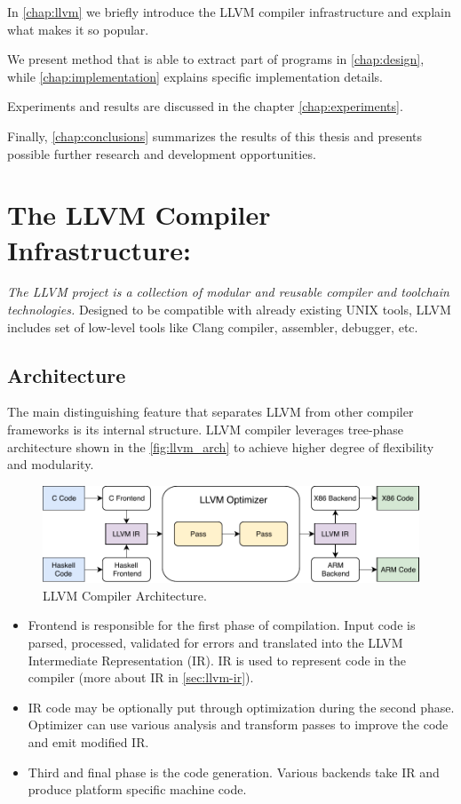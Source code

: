 \documentclass[12pt, twoside]{fithesis2}
\renewcommand{\_}{\leavevmode \kern0.07em\vbox{\hrule width0.4em}}
\newcommand{\squarebullet}{\textcolor{black}{\raisebox{0.15em}{\rule{4pt}{4pt}}}}
\newenvironment{myItemize}{
  \begin{itemize}[
    leftmargin=2em,
    rightmargin=1em,
    itemsep=\parskip,
    parsep=0em,
    topsep=0em,
    partopsep=0em
]
  \renewcommand{\labelitemi}{\squarebullet}
  \renewcommand{\labelitemii}{\textbullet}
}{
  \end{itemize}
}
\begin{document}
In \autoref{chap:llvm} we briefly introduce the LLVM compiler
infrastructure and explain what makes it so popular.

We present method that is able to extract part of programs in
\autoref{chap:design}, while \autoref{chap:implementation} explains specific
implementation details.

Experiments and results are discussed in the chapter
\autoref{chap:experiments}.

Finally, \autoref{chap:conclusions} summarizes the results of this thesis and
presents possible further research and development opportunities.


\chapter{The LLVM Compiler Infrastructure:}
\label{chap:llvm}

\emph{The LLVM project is a collection of modular and reusable compiler and
toolchain technologies.} \cite{llvm}
Designed to be compatible with already existing UNIX tools, LLVM includes
set of low-level tools like Clang compiler, assembler, debugger, etc. \cite{asoa}


\section{Architecture}
\label{sec:llvm-arch}

The main distinguishing feature that separates LLVM from other compiler
frameworks is its internal structure. LLVM compiler leverages tree-phase
architecture shown in the \autoref{fig:llvm_arch} to achieve higher degree of
flexibility and modularity.

\begin{figure}[ht]
    \centering
    \includegraphics[]{images/llvm/llvm_arch.pdf}
    \caption{LLVM Compiler Architecture.}
    \label{fig:llvm_arch}
\end{figure}

\begin{myItemize}
\item Frontend is responsible for the first phase of compilation. Input code is
parsed, processed, validated for errors and translated into the LLVM Intermediate
Representation (IR). IR is used to represent code in the compiler (more about IR
in \autoref{sec:llvm-ir}).
\item IR code may be optionally put through
optimization during the second phase. Optimizer can use various analysis and transform
passes to improve the code and emit modified IR.
\item Third and final phase is the code generation. Various backends take
IR and produce platform specific machine code.
\end{myItemize}
\end{document}
